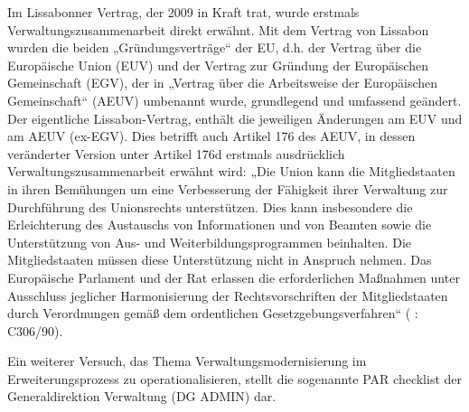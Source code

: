 Im Lissabonner Vertrag, der 2009 in Kraft trat, wurde erstmals Verwaltungszusammenarbeit direkt erwähnt. Mit dem Vertrag von Lissabon wurden die beiden „Gründungsverträge“ der EU, d.h. der Vertrag über die Europäische Union (EUV) und der Vertrag zur Gründung der Europäischen Gemeinschaft (EGV), der in „Vertrag über die Arbeitsweise der Europäischen Gemeinschaft“ (AEUV) umbenannt wurde, grundlegend und umfassend geändert. Der eigentliche Lissabon-Vertrag, enthält die jeweiligen Änderungen am EUV und am AEUV (ex-EGV). Dies betrifft auch Artikel 176 des AEUV, in dessen veränderter Version unter Artikel 176d erstmals ausdrücklich Verwaltungszusammenarbeit erwähnt wird: „Die Union kann die Mitgliedstaaten in ihren Bemühungen um eine Verbesserung der Fähigkeit ihrer Verwaltung zur Durchführung des Unionsrechts unterstützen. Dies kann insbesondere die Erleichterung des Austauschs von Informationen und von Beamten sowie die Unterstützung von Aus- und Weiterbildungsprogrammen beinhalten. Die Mitgliedstaaten müssen diese Unterstützung nicht in Anspruch nehmen. Das Europäische Parlament und der Rat erlassen die erforderlichen Maßnahmen unter Ausschluss jeglicher Harmonisierung der Rechtsvorschriften der Mitgliedstaaten durch Verordnungen gemäß dem ordentlichen Gesetzgebungsverfahren“ (\cite{verLis} : C306/90). \par
Ein weiterer Versuch, das Thema Verwaltungsmodernisierung im Erweiterungsprozess zu operationalisieren, stellt die sogenannte PAR checklist der Generaldirektion Verwaltung (DG ADMIN) dar. 

